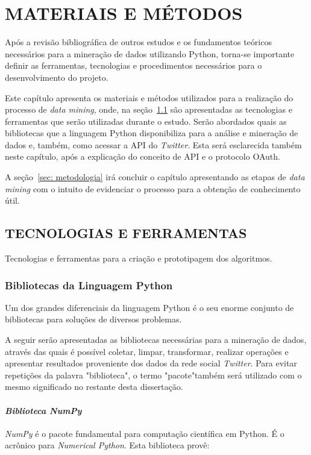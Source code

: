 \chapter{MATERIAIS E MÉTODOS}\label{ch:materiais-metodos}
Após a revisão bibliográfica de outros estudos e os fundamentos teóricos necessários para a mineração de dados utilizando Python, torna-se importante definir as ferramentas, tecnologias e procedimentos necessários para o desenvolvimento do projeto.

Este capítulo apresenta os materiais e métodos utilizados para a realização do processo de \textit{data mining}, onde, na seção~\ref{sec: tec-ferramenta} são apresentadas as tecnologias e ferramentas que serão utilizadas durante o estudo. Serão abordados quais as bibliotecas que a linguagem Python disponibiliza para a análise e mineração de dados e, também, como acessar a API do \textit{Twitter}. Esta será esclarecida também neste capítulo, após a explicação do conceito de API e o protocolo OAuth.

A seção~\ref{sec: metodologia} irá concluir o capítulo apresentando as etapas de \textit{data mining} com o intuito de evidenciar o processo para a obtenção de conhecimento útil.

\section{TECNOLOGIAS E FERRAMENTAS}\label{sec: tec-ferramenta}
Tecnologias e ferramentas para a criação e prototipagem dos algoritmos.

\subsection{Bibliotecas da Linguagem Python}\label{sec:bib_python}
Um dos grandes diferenciais da linguagem Python é o seu enorme conjunto de bibliotecas para soluções de diversos problemas.

A seguir serão apresentadas as bibliotecas necessárias para a mineração de dados, através das quais é possível coletar, limpar, transformar, realizar operações e apresentar resultados proveniente dos dados da rede social \textit{Twitter}. Para evitar repetições da palavra "biblioteca", o termo "pacote"\space também será utilizado com o mesmo significado no restante desta dissertação.
 
\subsubsection{\textit{Biblioteca NumPy}}
\textit{NumPy} é o pacote fundamental para computação científica em Python. É o acrônico para \textit{Numerical Python}. Esta biblioteca provê:

